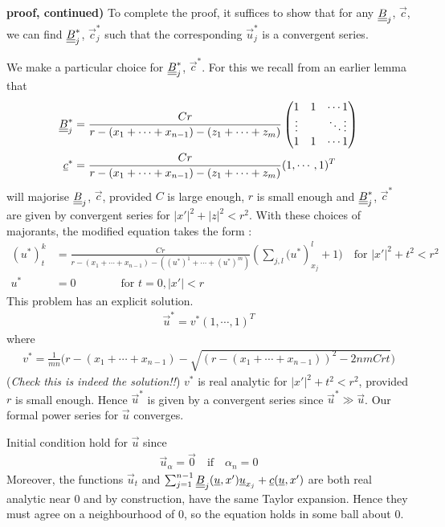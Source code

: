 \documentclass[10pt,a4paper]{report}
\newenvironment{proof}
{\begin{changemargin}{1cm}{0.5cm} 
	}%
	{\end{changemargin}
}
\begin{document}
\begin{proof}
\textbf{proof, continued)} To complete the proof, it suffices to show that for any $\underline{\underline{B}}_j$, $\vec{c}$, we can find $\underline{\underline{B}}^*_j$, $\vec{c}^*_j$ such that the corresponding $\vec{u}^*_j$ is a convergent series.

\quad We make a particular choice for $\underline{\underline{B}}^*_j$, $\vec{c}^*$. For this we recall from an earlier lemma that
\begin{align*}
\underline{\underline{B}}^*_j &= \frac{Cr}{r-(x_1+\cdots+x_{n-1}) - (z_1 + \cdots + z_m)} \begin{pmatrix}
1 & 1& \cdots 1 \\
\vdots & & \ddots \vdots \\
1 & 1 & \cdots 1
\end{pmatrix} \\
\underline{c}^* &= \frac{Cr}{r-(x_1+\cdots+x_{n-1}) - (z_1 + \cdots + z_m)} (1,\cdots, 1)^T
\end{align*}
will majorise $\underline{\underline{B}}_j$, $\vec{c}$, provided $C$ is large enough, $r$ is small enough and $\underline{\underline{B}}^*_j$, $\vec{c}^*$ are given by convergent series for $|x'|^2 + |z|^2 <r^2$. With these choices of majorants, the modified equation takes the form :
\begin{align*}
(u^*)^k_t  &= \frac{Cr}{r-(x_1+\cdots+x_{n-1}) - ((u^*)^1 + \cdots + (u^*)^m)} (\sum_{j,l} \big( u^*)^l_{x_j} +1 \big) \quad \text{for } |x'|^2 + t^2 <r^2 \\
u^* &= 0 \quad \quad \quad \quad \text{for } t=0,|x'|<r
\end{align*}
This problem has an explicit solution.
\begin{align*}
\vec{u}^* = v^* (1,\cdots,1)^T
\end{align*}
where
\begin{align*}
v^* = \frac{1}{mn} \Big( r - (x_1+ \cdots + x_{n-1}) - \sqrt{(r-(x_1+\cdots + x_{n-1}))^2 - 2nmCrt} \Big)
\end{align*}
(\emph{Check this is indeed the solution!!}) $v^*$ is real analytic for $|x'|^2 + t^2 < r^2$, provided $r$ is small enough. Hence $\vec{u}^*$ is given by a convergent series since $\vec{u}^* \gg \vec{u}$. Our formal power series for $\vec{u}$ converges.

\quad Initial condition hold for $\vec{u}$ since
\begin{align*}
\vec{u}_{\alpha} = \vec{0} \quad \text{if} \quad \alpha_n =0
\end{align*}
Moreover, the functions $\vec{u}_t$ and $\sum_{j=1}^{n-1} \underline{\underline{B}}_j(\underline{u},x') \underline{u}_{x_j} + \underline{c}(\underline{u},x')$ are both real analytic near 0 and by construction, have the same Taylor expansion. Hence they must agree on a neighbourhood of 0, so the equation holds in some ball about 0.

\eop 
\end{proof}
\s
\end{document}
